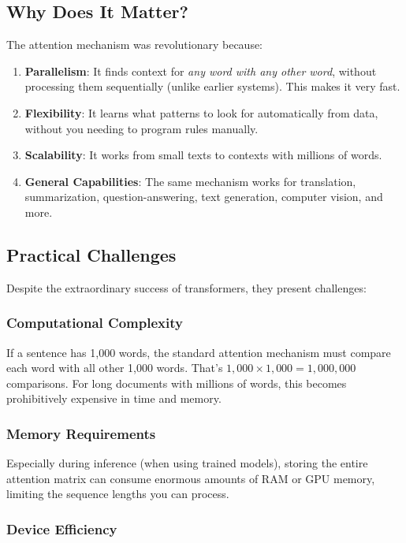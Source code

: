 \documentclass[11pt,a4paper]{article}
\begin{document}
\subsection{Why Does It Matter?}

The attention mechanism was revolutionary because:
\begin{enumerate}[leftmargin=*]
    \item \textbf{Parallelism}: It finds context for \emph{any word with any other word}, without processing them sequentially (unlike earlier systems). This makes it very fast.
    \item \textbf{Flexibility}: It learns what patterns to look for automatically from data, without you needing to program rules manually.
    \item \textbf{Scalability}: It works from small texts to contexts with millions of words.
    \item \textbf{General Capabilities}: The same mechanism works for translation, summarization, question-answering, text generation, computer vision, and more.
\end{enumerate}

\subsection{Practical Challenges}

Despite the extraordinary success of transformers, they present challenges:

\subsubsection{Computational Complexity}

If a sentence has 1,000 words, the standard attention mechanism must compare each word with all other 1,000 words. That's $1,000 \times 1,000 = 1,000,000$ comparisons. For long documents with millions of words, this becomes prohibitively expensive in time and memory.

\subsubsection{Memory Requirements}

Especially during inference (when using trained models), storing the entire attention matrix can consume enormous amounts of RAM or GPU memory, limiting the sequence lengths you can process.

\subsubsection{Device Efficiency}
\end{document}
